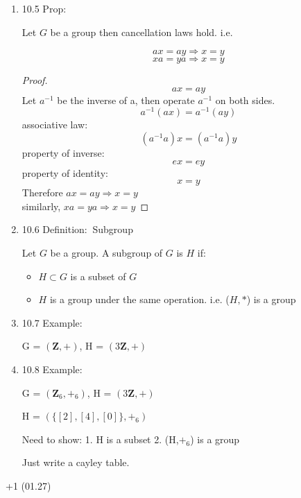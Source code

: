 \documentclass[12pt]{article}
\newcommand{\defi}{{\color{blue} Definition: $\ $}}
\newcommand{\exe}{{\color{green} Example: $\ $}}
\newcommand{\prop}{{\color{blue} Prop: $\ $}}
\begin{document}
\begin{enumerate}
\begin{enumerate}
\begin{proof}
            Therefore, $\exists ! y \in G \ \text{ s.t. } \ xy = e \text{ and } yx = e$
        \end{proof}
        
        \item 10.5 \prop
        
        Let $G$ be a group then cancellation laws hold. i.e.

        $$ax = ay \Rightarrow x = y$$
        $$xa = ya \Rightarrow x = y$$

        \begin{proof}
            $$ax = ay$$
            Let $a^{-1}$ be the inverse of a, then operate $a^{-1}$ on both sides.
            $$a^{-1}(ax) = a^{-1}(ay)$$
            associative law:
            $$(a^{-1}a)x = (a^{-1}a)y $$
            property of inverse:
            $$ex = ey$$
            property of identity:
            $$x = y$$
            Therefore $ax = ay \Rightarrow x = y$\\
            similarly, $xa = ya \Rightarrow x = y$
        \end{proof}

        \item 10.6 \defi Subgroup
        
        Let $G$ be a group. A subgroup of $G$ is $H$ if:
        \begin{itemize}
            \item $H \subset G$ is a subset of $G$
            \item $H$ is a group under the same operation. i.e. ($H,*$) is a group
        \end{itemize}
        
        \item 10.7 \exe
        
        G = $(\mathbf{Z}, +)$, H = $(3\mathbf{Z}, +)$

        \item 10.8 \exe 
        
        G = $(\mathbf{Z}_6, +_6)$, H = $(3\mathbf{Z}, +)$

        H = $(\{[2], [4], [0]\}, +_6)$

        Need to show: 1. H is a subset 2. (H,$+_6$) is a group

        Just write a cayley table.

    \end{enumerate}
+1 (01.27)
\end{enumerate}
\end{document}
